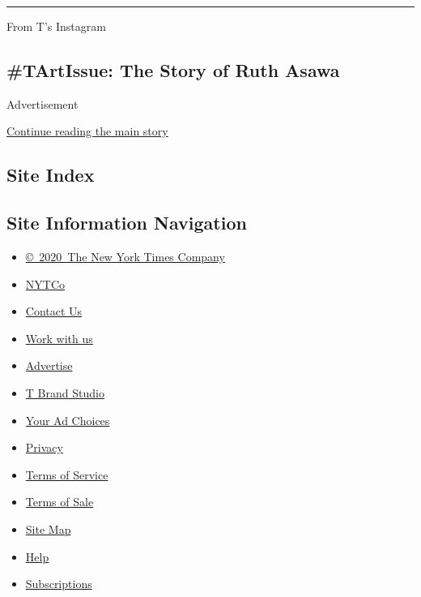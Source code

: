 \begin{center}\rule{0.5\linewidth}{\linethickness}\end{center}

From T's Instagram

\hypertarget{tartissue-the-story-of-ruth-asawa}{%
\subsection{\#TArtIssue: The Story of Ruth
Asawa}\label{tartissue-the-story-of-ruth-asawa}}

Advertisement

\protect\hyperlink{after-bottom}{Continue reading the main story}

\hypertarget{site-index}{%
\subsection{Site Index}\label{site-index}}

\hypertarget{site-information-navigation}{%
\subsection{Site Information
Navigation}\label{site-information-navigation}}

\begin{itemize}
\tightlist
\item
  \href{https://help.nytimes3xbfgragh.onion/hc/en-us/articles/115014792127-Copyright-notice}{©~2020~The
  New York Times Company}
\end{itemize}

\begin{itemize}
\tightlist
\item
  \href{https://www.nytco.com/}{NYTCo}
\item
  \href{https://help.nytimes3xbfgragh.onion/hc/en-us/articles/115015385887-Contact-Us}{Contact
  Us}
\item
  \href{https://www.nytco.com/careers/}{Work with us}
\item
  \href{https://nytmediakit.com/}{Advertise}
\item
  \href{http://www.tbrandstudio.com/}{T Brand Studio}
\item
  \href{https://www.nytimes3xbfgragh.onion/privacy/cookie-policy\#how-do-i-manage-trackers}{Your
  Ad Choices}
\item
  \href{https://www.nytimes3xbfgragh.onion/privacy}{Privacy}
\item
  \href{https://help.nytimes3xbfgragh.onion/hc/en-us/articles/115014893428-Terms-of-service}{Terms
  of Service}
\item
  \href{https://help.nytimes3xbfgragh.onion/hc/en-us/articles/115014893968-Terms-of-sale}{Terms
  of Sale}
\item
  \href{https://spiderbites.nytimes3xbfgragh.onion}{Site Map}
\item
  \href{https://help.nytimes3xbfgragh.onion/hc/en-us}{Help}
\item
  \href{https://www.nytimes3xbfgragh.onion/subscription?campaignId=37WXW}{Subscriptions}
\end{itemize}
